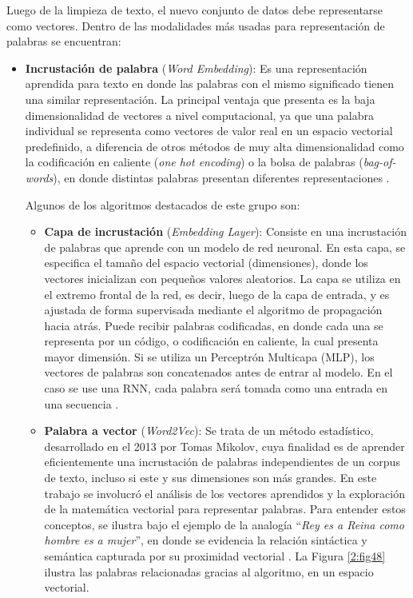 Luego de la limpieza de texto, el nuevo conjunto de datos debe representarse como vectores. Dentro de las modalidades más usadas para representación de palabras se encuentran:
\begin{itemize}
	\item \textbf{Incrustación de palabra} (\textit{Word Embedding}): Es una representación aprendida para texto en donde las palabras con el mismo significado tienen una similar representación. La principal ventaja que presenta es la baja dimensionalidad de vectores a nivel computacional, ya que una palabra individual se representa como vectores de valor real en un espacio vectorial predefinido, a diferencia de otros métodos de muy alta dimensionalidad como la codificación en caliente (\textit{one hot encoding}) o la bolsa de palabras (\textit{bag-of-words}), en donde distintas palabras presentan diferentes representaciones \parencite{bk_brownlee2017deeplearning_nlp}.
	
	Algunos de los algoritmos destacados de este grupo son:
	\begin{itemize}
		\item \textbf{Capa de incrustación} (\textit{Embedding Layer}): Consiste en una incrustación de palabras que aprende con un modelo de red neuronal. En esta capa, se especifica el tamaño del espacio vectorial (dimensiones), donde los vectores inicializan con pequeños valores aleatorios. La capa se utiliza en el extremo frontal de la red, es decir, luego de la capa de entrada, y es ajustada de forma supervisada mediante el algoritmo de propagación hacia atrás. Puede recibir palabras codificadas, en donde cada una se representa por un código, o codificación en caliente, la cual presenta mayor dimensión. Si se utiliza un Perceptrón Multicapa (MLP), los vectores de palabras son concatenados antes de entrar al modelo. En el caso se use una RNN, cada palabra será tomada como una entrada en una secuencia \parencite{bk_brownlee2017deeplearning_nlp}.
		
		
		
		\item \textbf{Palabra a vector} (\textit{Word2Vec}): Se trata de un método estadístico, desarrollado en el 2013 por Tomas Mikolov, cuya finalidad es de aprender eficientemente una incrustación de palabras independientes de un corpus de texto, incluso si este y sus dimensiones son más grandes. En este trabajo se involucró el análisis de los vectores aprendidos y la exploración de la matemática vectorial para representar palabras. Para entender estos conceptos, se ilustra bajo el ejemplo de la analogía “\textit{Rey es a Reina como hombre es a mujer}”, en donde se evidencia la relación sintáctica y semántica capturada por su proximidad vectorial \parencite{bk_brownlee2017deeplearning_nlp}. La Figura \ref{2:fig48} ilustra las palabras relacionadas gracias al algoritmo, en un espacio vectorial.
		

\end{itemize}
\end{itemize}
